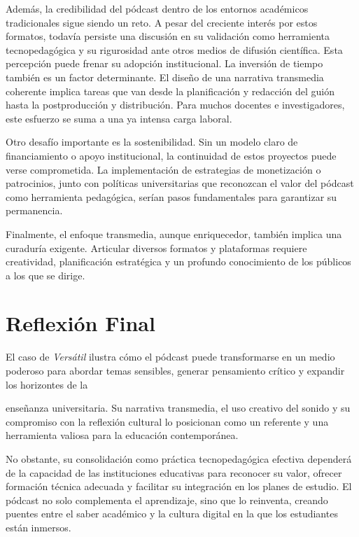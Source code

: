 \documentclass[
]{interact}
\begin{document}
Además, la credibilidad del pódcast dentro de los entornos académicos
tradicionales sigue siendo un reto. A pesar del creciente interés por
estos formatos, todavía persiste una discusión en su validación como
herramienta tecnopedagógica y su rigurosidad ante otros medios de
difusión científica. Esta percepción puede frenar su adopción
institucional. La inversión de tiempo también es un factor determinante.
El diseño de una narrativa transmedia coherente implica tareas que van
desde la planificación y redacción del guión hasta la postproducción y
distribución. Para muchos docentes e investigadores, este esfuerzo se
suma a una ya intensa carga laboral.

Otro desafío importante es la sostenibilidad. Sin un modelo claro de
financiamiento o apoyo institucional, la continuidad de estos proyectos
puede verse comprometida. La implementación de estrategias de
monetización o patrocinios, junto con políticas universitarias que
reconozcan el valor del pódcast como herramienta pedagógica, serían
pasos fundamentales para garantizar su permanencia.

Finalmente, el enfoque transmedia, aunque enriquecedor, también implica
una curaduría exigente. Articular diversos formatos y plataformas
requiere creatividad, planificación estratégica y un profundo
conocimiento de los públicos a los que se dirige.

\section{Reflexión Final}\label{reflexiuxf3n-final}

El caso de \emph{Versátil} ilustra cómo el pódcast puede transformarse
en un medio poderoso para abordar temas sensibles, generar pensamiento
crítico y expandir los horizontes de la

enseñanza universitaria. Su narrativa transmedia, el uso creativo del
sonido y su compromiso con la reflexión cultural lo posicionan como un
referente y una herramienta valiosa para la educación contemporánea.

No obstante, su consolidación como práctica tecnopedagógica efectiva
dependerá de la capacidad de las instituciones educativas para reconocer
su valor, ofrecer formación técnica adecuada y facilitar su integración
en los planes de estudio. El pódcast no solo complementa el aprendizaje,
sino que lo reinventa, creando puentes entre el saber académico y la
cultura digital en la que los estudiantes están inmersos.
\end{document}
